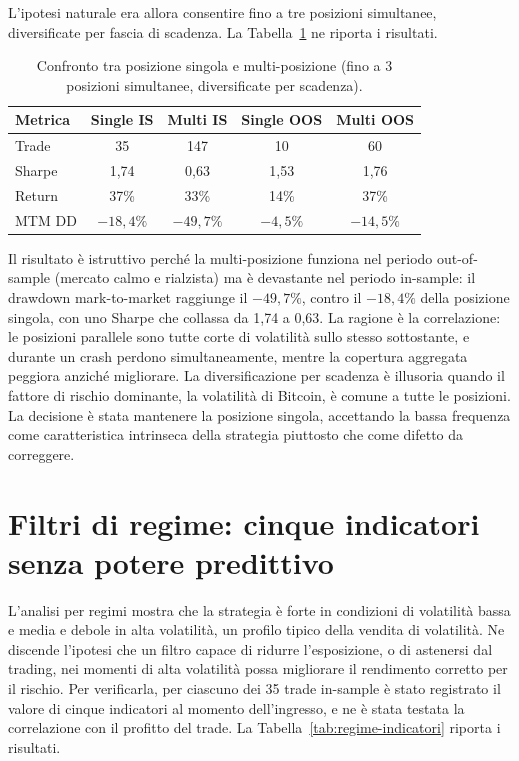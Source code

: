 L'ipotesi naturale era allora consentire fino a tre posizioni simultanee,
diversificate per fascia di scadenza. La
Tabella~\ref{tab:multi-position} ne riporta i risultati.

\begin{table}[H]
\centering
\caption{Confronto tra posizione singola e multi-posizione (fino a 3
posizioni simultanee, diversificate per scadenza).}
\label{tab:multi-position}
\begin{tabular}{lcccc}
\toprule
\textbf{Metrica} & \textbf{Single IS} & \textbf{Multi IS} & \textbf{Single OOS} & \textbf{Multi OOS} \\
\midrule
Trade    & 35      & 147     & 10      & 60 \\
Sharpe   & 1,74    & 0,63    & 1,53    & 1,76 \\
Return   & 37\%    & 33\%    & 14\%    & 37\% \\
MTM DD   & $-18{,}4\%$ & $-49{,}7\%$ & $-4{,}5\%$ & $-14{,}5\%$ \\
\bottomrule
\end{tabular}
\end{table}

Il risultato è istruttivo perché la multi-posizione funziona nel periodo
out-of-sample (mercato calmo e rialzista) ma è devastante nel periodo
in-sample: il drawdown mark-to-market raggiunge il $-49{,}7\%$, contro il
$-18{,}4\%$ della posizione singola, con uno Sharpe che collassa da 1,74 a
0,63. La ragione è la correlazione: le posizioni parallele sono tutte corte
di volatilità sullo stesso sottostante, e durante un crash perdono
simultaneamente, mentre la copertura aggregata peggiora anziché migliorare.
La diversificazione per scadenza è illusoria quando il fattore di rischio
dominante, la volatilità di Bitcoin, è comune a tutte le posizioni. La
decisione è stata mantenere la posizione singola, accettando la bassa
frequenza come caratteristica intrinseca della strategia piuttosto che come
difetto da correggere.

\section{Filtri di regime: cinque indicatori senza potere predittivo}
\label{sec:percorso-regime}

L'analisi per regimi mostra che la strategia è forte in condizioni di
volatilità bassa e media e debole in alta volatilità, un profilo tipico
della vendita di volatilità. Ne discende l'ipotesi che un filtro capace di
ridurre l'esposizione, o di astenersi dal trading, nei momenti di alta
volatilità possa migliorare il rendimento corretto per il rischio. Per
verificarla, per ciascuno dei 35 trade in-sample è stato registrato il
valore di cinque indicatori al momento dell'ingresso, e ne è stata testata
la correlazione con il profitto del trade. La
Tabella~\ref{tab:regime-indicatori} riporta i risultati.

